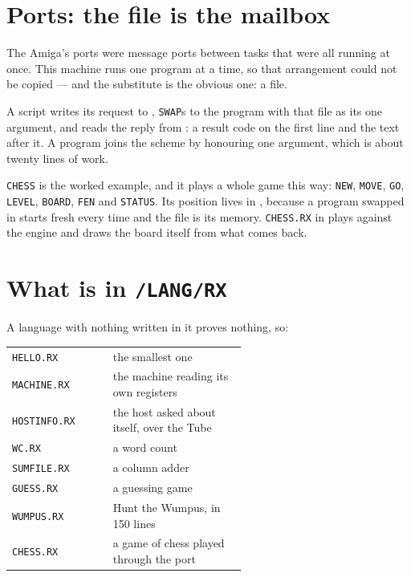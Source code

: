 \section{Ports: the file is the mailbox}
The Amiga's ports were message ports between tasks that were all running
at once. This machine runs one program at a time, so that arrangement
could not be copied --- and the substitute is the obvious one: a file.

A script writes its request to , \verb|SWAP|s to
the program with that file as its one argument, and reads the reply from
: a result code on the first line and the text
after it. A program joins the scheme by honouring one argument, which is
about twenty lines of work.

\verb|CHESS| is the worked example, and it plays a whole game this way:
\verb|NEW|, \verb|MOVE|, \verb|GO|, \verb|LEVEL|, \verb|BOARD|,
\verb|FEN| and \verb|STATUS|. Its position lives in
, because a program swapped in starts fresh
every time and the file is its memory. \texttt{CHESS.RX} in
 plays against the engine and draws the board itself from
what comes back.

\section{What is in \texttt{/LANG/RX}}
A language with nothing written in it proves nothing, so:

\begin{center}
\small
\begin{tabular}{@{}l >{\raggedright\arraybackslash}p{0.58\linewidth}@{}}
\toprule
\texttt{HELLO.RX} & the smallest one \\
\texttt{MACHINE.RX} & the machine reading its own registers \\
\texttt{HOSTINFO.RX} & the host asked about itself, over the Tube \\
\texttt{WC.RX} & a word count \\
\texttt{SUMFILE.RX} & a column adder \\
\texttt{GUESS.RX} & a guessing game \\
\texttt{WUMPUS.RX} & Hunt the Wumpus, in 150 lines \\
\texttt{CHESS.RX} & a game of chess played through the port \\
\bottomrule
\end{tabular}
\end{center}

